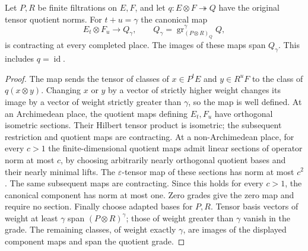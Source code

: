 \begin{lemma}
\label{lem:tensor-grade-components}
\leanok
Let $P,R$ be finite filtrations on $E,F$, and let
$q:E\otimes F\twoheadrightarrow Q$ have the original tensor quotient norms.
For $t+u=\gamma$ the canonical map
\[
 E_t\otimes F_u\longrightarrow Q_\gamma,
 \qquad Q_\gamma=\operatorname{gr}_{(P\otimes R)_Q}^{\gamma}Q,
\]
is contracting at every completed place. The images of these maps span
$Q_\gamma$. This includes $q=\operatorname{id}$.
\end{lemma}
\begin{proof}
The map sends the tensor of classes of $x\in P^tE$ and $y\in R^uF$
to the class of $q(x\otimes y)$. Changing $x$ or $y$ by a vector of
strictly higher weight changes its image by a vector of weight strictly
greater than $\gamma$, so the map is well defined.
At an Archimedean place, the quotient maps defining $E_t,F_u$ have
orthogonal isometric sections. Their Hilbert tensor product is isometric;
the subsequent restriction and quotient maps are contracting.
At a non-Archimedean place, for every $c>1$ the finite-dimensional quotient
maps admit linear sections of operator norm at most $c$, by choosing
arbitrarily nearly orthogonal quotient bases and their nearly minimal lifts.
The $\varepsilon$-tensor map of these sections has norm at most $c^2$.
The same subsequent maps are contracting. Since this holds for every
$c>1$, the canonical component has norm at most one. Zero grades give
the zero map and require no section.
Finally choose adapted bases for $P,R$. Tensor basis vectors of weight
at least $\gamma$ span $(P\otimes R)^\gamma$; those of weight greater
than $\gamma$ vanish in the grade. The remaining classes, of weight
exactly $\gamma$, are images of the displayed component maps and span
the quotient grade.
\end{proof}

